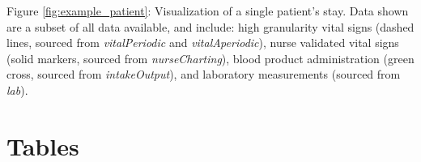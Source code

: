 \documentclass[english]{article}
\newcommand{\tblname}[1]{\emph{#1}}
\begin{document}
\noindent
Figure \ref{fig:example_patient}: Visualization of a single patient's stay. Data shown are a subset of all data available, and include: high granularity vital signs (dashed lines, sourced from \tblname{vitalPeriodic} and \tblname{vitalAperiodic}), nurse validated vital signs (solid markers, sourced from \tblname{nurseCharting}), blood product administration (green cross, sourced from \tblname{intakeOutput}), and laboratory measurements (sourced from \tblname{lab}).

\clearpage
\section*{Tables}



\end{document}
